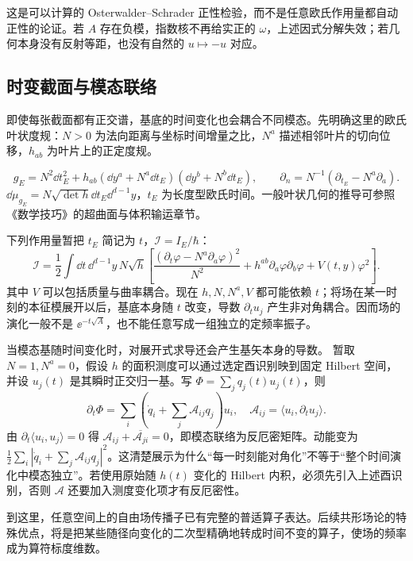 这是可以计算的 Osterwalder--Schrader 正性检验，而不是任意欧氏作用量都自动正性的论证。若 $A$ 存在负模，指数核不再给实正的 $\omega$，上述因式分解失效；若几何本身没有反射等距，也没有自然的 $u\mapsto-u$ 对应。


\subsection{时变截面与模态联络}

即使每张截面都有正交谱，基底的时间变化也会耦合不同模态。先明确这里的欧氏叶状度规：$N>0$ 为法向距离与坐标时间增量之比，$N^a$ 描述相邻叶片的切向位移，$h_{ab}$ 为叶片上的正定度规。
\begin{definition}[欧氏叶状度规与法向导数]
\begin{equation}\label{eq:ghs-foliation-adm}
 g_E=N^2\dd t_E^2+h_{ab}(\dd y^a+N^a\dd t_E)(\dd y^b+N^b\dd t_E),
 \qquad \partial_n=N^{-1}(\partial_{t_E}-N^a\partial_a).
\end{equation}
$\dd\mu_{g_E}=N\sqrt{\det h}\dd t_E\dd^{d-1}y$，$t_E$ 为长度型欧氏时间。一般叶状几何的推导可参照《数学技巧》的超曲面与体积输运章节。
\end{definition}
下列作用量暂把 $t_E$ 简记为 $t$，$\mathscr I=I_E/\hbar$：
\begin{equation}\label{eq:ghs-general-foliation-action}
 \mathscr I=\frac12\int\dd t\,\dd^{d-1}y\,N\sqrt h
 \left[\frac{(\partial_t\varphi-N^a\partial_a\varphi)^2}{N^2}
 +h^{ab}\partial_a\varphi\partial_b\varphi+V(t,y)\varphi^2\right].
\end{equation}
其中 $V$ 可以包括质量与曲率耦合。现在 $h,N,N^a,V$ 都可能依赖 $t$；将场在某一时刻的本征模展开以后，基底本身随 $t$ 改变，导数 $\partial_tu_j$ 产生非对角耦合。因而场的演化一般不是 $\ee^{-t\sqrt A}$，也不能任意写成一组独立的定频率振子。


当模态基随时间变化时，对展开式求导还会产生基矢本身的导数。
暂取 $N=1,N^a=0$，假设 $h$ 的面积测度可以通过选定酉识别映到固定 Hilbert 空间，并设 $u_j(t)$ 是其瞬时正交归一基。写 $\Phi=\sum_jq_j(t)u_j(t)$，则
\[
 \partial_t\Phi=\sum_i\left(\dot q_i+\sum_j\mathcal A_{ij}q_j\right)u_i,
 \quad \mathcal A_{ij}=\langle u_i,\partial_tu_j\rangle.
\]
由 $\partial_t\langle u_i,u_j\rangle=0$ 得 $\mathcal A_{ij}+\overline{\mathcal A_{ji}}=0$，即模态联络为反厄密矩阵。动能变为
$\frac12\sum_i|\dot q_i+\sum_j\mathcal A_{ij}q_j|^2$。这清楚展示为什么“每一时刻能对角化”不等于“整个时间演化中模态独立”。若使用原始随 $h(t)$ 变化的 Hilbert 内积，必须先引入上述酉识别，否则 $\mathcal A$ 还要加入测度变化项才有反厄密性。


到这里，任意空间上的自由场传播子已有完整的普适算子表达。后续共形场论的特殊优点，将是把某些随径向变化的二次型精确地转成时间不变的算子，使场的频率成为算符标度维数。




